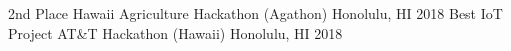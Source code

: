 \begin{cvhonors}
	\cvhonor
	    {2nd Place}
	    {Hawaii Agriculture Hackathon (Agathon)}
	    {Honolulu, HI}
	    {2018}  
	\cvhonor
	    {Best IoT Project}
	    {AT\&T Hackathon (Hawaii)}
	    {Honolulu, HI}
	    {2018}
\end{cvhonors}

